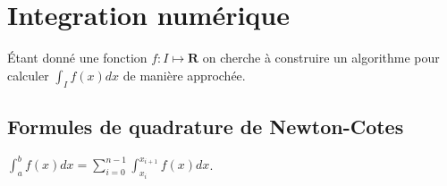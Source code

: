 \documentclass[12pt]{book}
\theoremstyle{definition}
\theoremstyle{remark}
\begin{document}
	\chapter{Integration numérique}
	Étant donné une fonction $f : I \longmapsto \mathbf{R}$ on cherche à construire un algorithme pour calculer $\int_I{f(x)dx}$ de manière approchée.
	\section{Formules de quadrature de Newton-Cotes}
	$\int_a^b{f(x)dx} = \sum_{i=0}^{n-1}\int_{x_i}^{x_{i+1}}{f(x)dx}$.
\end{document}
